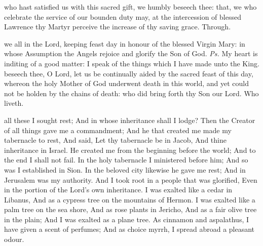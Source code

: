 \postcommunion
{} who hast satisfied us with this sacred gift, we humbly beseech thee: that, we who celebrate the service of our bounden duty may, at the intercession of blessed Lawrence thy Martyr perceive the increase of thy saving grace. Through.


\clearpage
{}

\introit
{} we all in the Lord, keeping feast day in honour of the blessed Virgin Mary: in whose Assumption the Angels rejoice and glorify the Son of God. \textit{Ps.} My heart is inditing of a good matter: I speak of the things which I have made unto the King.
\collect
{} beseech thee, O Lord, let us be continually aided by the sacred feast of this day, whereon the holy Mother of God underwent death in this world, and yet could not be holden by the chains of death: who did bring forth thy Son our Lord. Who liveth.

 all these I sought rest; And in whose inheritance shall I lodge? Then the Creator of all things gave me a commandment; And he that created me made my tabernacle to rest, And said, Let thy tabernacle be in Jacob, And thine inheritance in Israel. He created me from the beginning before the world; And to the end I shall not fail. In the holy tabernacle I ministered before him; And so was I established in Sion. In the beloved city likewise he gave me rest; And in Jerusalem was my authority. And I took root in a people that was glorified, Even in the portion of the Lord’s own inheritance. I was exalted like a cedar in Libanus, And as a cypress tree on the mountains of Hermon. I was exalted like a palm tree on the sea shore, And as rose plants in Jericho, And as a fair olive tree in the plain; And I was exalted as a plane tree. As cinnamon and aspalathus, I have given a scent of perfumes; And as choice myrrh, I spread abroad a pleasant odour.


